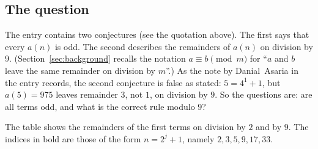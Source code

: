 \documentclass[11pt,a4paper]{article}
\theoremstyle{definition}
\theoremstyle{remark}
\begin{document}
\subsection{The question}
The entry contains two conjectures (see the quotation above). The first says that every $a(n)$ is odd. The
second describes the remainders of $a(n)$ on division by $9$. (Section~\ref{sec:background} recalls the notation
$a\equiv b\pmod m$ for ``$a$ and $b$ leave the same remainder on division by $m$''.) As the note by Danial~Asaria in the
entry records, the second conjecture is false as stated: $5=4^1+1$, but $a(5)=975$ leaves remainder $3$, not $1$, on
division by $9$. So the questions are: are all terms odd, and what is the correct rule modulo $9$?

The table shows the remainders of the first terms on division by $2$ and by $9$. The indices in bold are those of the
form $n=2^j+1$, namely $2,3,5,9,17,33$.
\end{document}
